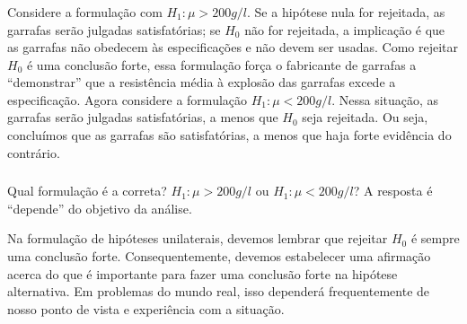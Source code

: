 \documentclass[14pt,aspectratio=1610]{beamer}
\newcommand{\Ho}{\ensuremath{H_{0}}}
\begin{document}
\begin{frame}{}
\frametitle{}
\begin{block}{}
\justifying
Considere a formulação com $H_{1}:\mu> 200 g/l$. Se a hipótese nula for rejeitada, as garrafas serão julgadas satisfatórias; se $\Ho$ não for rejeitada, a implicação é 
que as garrafas não obedecem às especificações e não devem ser usadas. Como rejeitar $\Ho$ é uma conclusão forte, essa formulação força o fabricante de garrafas a 
``demonstrar'' que a resistência média à explosão das garrafas excede a especificação. Agora considere a formulação $H_{1}:\mu< 200 g/l$. Nessa situação, as garrafas 
serão julgadas satisfatórias, a menos que $\Ho$ seja rejeitada. Ou seja, concluímos que as garrafas são satisfatórias, a menos que haja forte evidência do contrário.
\end{block}
\end{frame}

\begin{frame}{}
\frametitle{}
\begin{block}{}
\justifying
Qual formulação é a correta? $H_{1}:\mu> 200 g/l$ ou $H_{1}:\mu< 200 g/l$? \pause A resposta é ``depende'' do objetivo da análise.
\end{block}
\pause
\begin{block}{}
Na formulação de hipóteses unilaterais, devemos lembrar que rejeitar $\Ho$ é sempre uma conclusão forte. Consequentemente, devemos estabelecer uma afirmação 
acerca do que é importante para fazer uma conclusão forte na hipótese alternativa. Em problemas do mundo real, isso dependerá frequentemente de nosso ponto de 
vista e experiência com a situação.
\end{block}
\end{frame}
\end{document}
